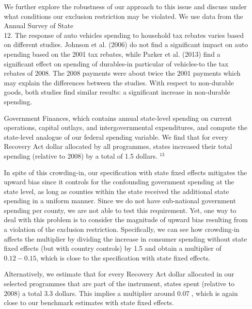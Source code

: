 \documentclass[10pt]{article}
\begin{document}
We further explore the robustness of our approach to this issue and discuss under what conditions our exclusion restriction may be violated. We use data from the Annual Survey of State\\
12. The response of auto vehicles spending to household tax rebates varies based on different studies. Johnson et al. (2006) do not find a significant impact on auto spending based on the 2001 tax rebates, while Parker et al. (2013) find a significant effect on spending of durables-in particular of vehicles-to the tax rebates of 2008. The 2008 payments were about twice the 2001 payments which may explain the differences between the studies. With respect to non-durable goods, both studies find similar results: a significant increase in non-durable spending.

Government Finances, which contains annual state-level spending on current operations, capital outlays, and intergovernmental expenditures, and compute the state-level analogue of our federal spending variable. We find that for every Recovery Act dollar allocated by all programmes, states increased their total spending (relative to 2008) by a total of 1.5 dollars. ${ }^{13}$

In spite of this crowding-in, our specification with state fixed effects mitigates the upward bias since it controls for the confounding government spending at the state level, as long as counties within the state received the additional state spending in a uniform manner. Since we do not have sub-national government spending per county, we are not able to test this requirement. Yet, one way to deal with this problem is to consider the magnitude of upward bias resulting from a violation of the exclusion restriction. Specifically, we can see how crowding-in affects the multiplier by dividing the increase in consumer spending without state fixed effects (but with country controls) by 1.5 and obtain a multiplier of $0.12-0.15$, which is close to the specification with state fixed effects.

Alternatively, we estimate that for every Recovery Act dollar allocated in our selected programmes that are part of the instrument, states spent (relative to 2008) a total 3.3 dollars. This implies a multiplier around 0.07 , which is again close to our benchmark estimates with state fixed effects.
\end{document}
